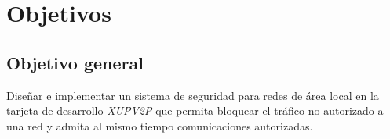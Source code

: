 \section{Objetivos}

\subsection{Objetivo general}



Diseñar e implementar un sistema de seguridad para redes de \'area local
en la tarjeta de desarrollo \emph{XUPV2P} que permita bloquear el tráfico no
autorizado a una red y admita al mismo tiempo comunicaciones autorizadas.


